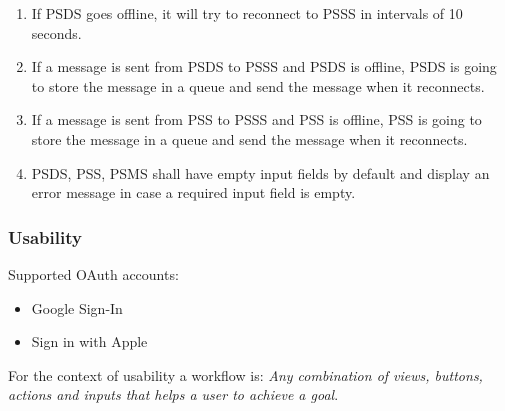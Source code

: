 \begin{enumerate}[label=ROB-\arabic*]
    \item If PSDS goes offline, it will try to reconnect to PSSS in 
    intervals of 10 seconds.
    \item If a message is sent from PSDS to PSSS and PSDS is offline, PSDS is 
    going to store the message in a queue and send the message 
    when it reconnects.
    \item If a message is sent from PSS to PSSS and PSS is offline, PSS is 
    going to store the message in a queue and send the message 
    when it reconnects.
    \item PSDS, PSS, PSMS shall have empty input fields by default and display 
    an error message in case a required input field is empty.
\end{enumerate}
\pagebreak
\subsubsection{Usability}
Supported OAuth accounts: 
\begin{itemize}
    \item Google Sign-In
    \item Sign in with Apple
\end{itemize}
 
\noindent For the context of usability a workflow is: \textit{Any combination 
of views, buttons, actions and inputs that helps a user to achieve a goal}.

